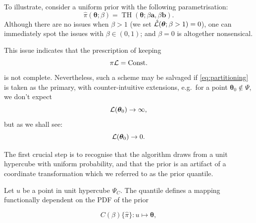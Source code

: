 \documentclass[usenatbib]{mnras}
\DeclareMathOperator{\TopHat}{TH}
\begin{document}
To illustrate, consider a uniform prior with the following
parametrisation:
\begin{equation}
  \hat{\pi}(\bm{\theta}; \beta) = \TopHat(\bm{\theta}; \beta \bm{a}, \beta \bm{b}).
\end{equation}
Although there are no issues when \(\beta>1\) (we set
\({\cal\hat{L}}(\bm{\theta}; \beta>1)=0\)), one can immediately
spot the issues with \(\beta \in (0,1)\); and \(\beta=0\) is
altogether nonsensical.

This issue indicates that the prescription of keeping
\begin{equation}
  \pi {\cal L} = \text{Const.}
\end{equation}
is not complete. Nevertheless, such a scheme may be salvaged if
\cref{eq:partitioning} is taken as the primary, with counter-intuitive
extensions, e.g.~for a point \(\bm{\theta}_{0} \notin \Psi\), we don't
expect
\begin{equation}
{\cal L}(\bm{\theta}_{0}) \rightarrow \infty,
\end{equation}
but as we shall see:
  \begin{equation}
    {\cal L}(\bm{\theta}_{0}) \rightarrow 0.
  \end{equation}
  
The first crucial step is to recognise that the algorithm draws
from a unit hypercube with uniform probability, and that the prior
is an artifact of a coordinate transformation which we referred to
as the prior quantile.

Let \(u\) be a point in unit hypercube \(\Psi_{C}\). The quantile
defines a mapping functionally dependent on the PDF of the prior

\begin{equation}
  C(\beta)\lbrace \hat{\pi}\rbrace:u \mapsto \bm{\theta},\label{eq:coordinate-transform}
\end{equation}
\end{document}
